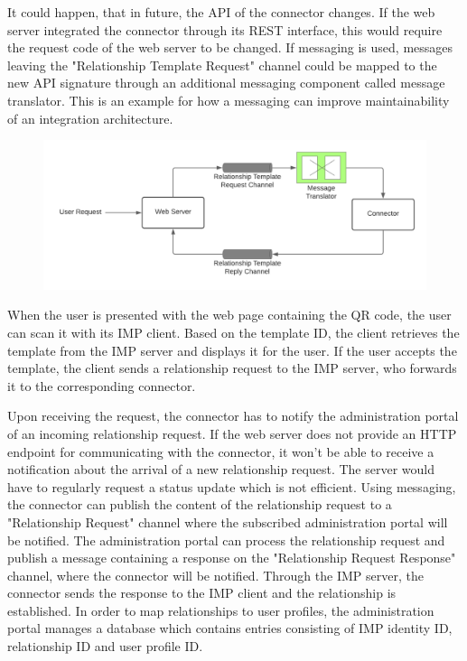 \documentclass[
     12pt,         %
     a4paper,      %
     BCOR=10mm,version=first,     %
     DIV=14,version=first,        %
     ]{scrreprt}
\begin{document}
It could happen, that in future, the API of the connector changes. If the web server integrated the connector through its REST interface, this would require the request code of the web server to be changed. If messaging is used, messages leaving the "Relationship Template Request" channel could be mapped to the new API signature through an additional messaging component called message translator. This is an example for how a messaging can improve maintainability of an integration architecture.

\begin{figure}[h]
    \centering
    \includegraphics[scale=0.3]{Diagrams/Integration Architecture 1/Overview/Relationship Template Messaging Improved.png}
\end{figure}


When the user is presented with the web page containing the QR code, the user can scan it with its IMP client. Based on the template ID, the client retrieves the template from the IMP server and displays it for the user. If the user accepts the template, the client sends a relationship request to the IMP server, who forwards it to the corresponding connector.

Upon receiving the request, the connector has to notify the administration portal of an incoming relationship request. If the web server does not provide an HTTP endpoint for communicating with the connector, it won't be able to receive a notification about the arrival of a new relationship request. The server would have to regularly request a status update which is not efficient. Using messaging, the connector can publish the content of the relationship request to a "Relationship Request" channel where the subscribed administration portal will be notified. The administration portal can process the relationship request and publish a message containing a response on the "Relationship Request Response" channel, where the connector will be notified. Through the IMP server, the connector sends the response to the IMP client and the relationship is established.
In order to map relationships to user profiles, the administration portal manages a database which contains entries consisting of IMP identity ID, relationship ID and user profile ID.
\end{document}
